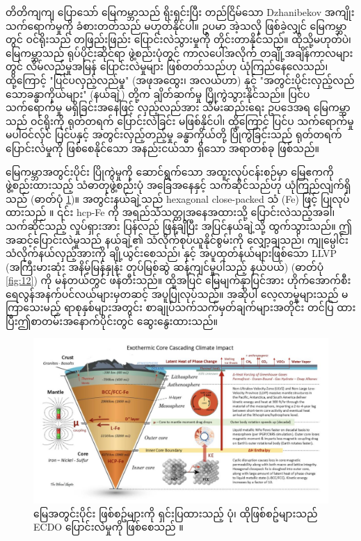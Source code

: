 \documentclass[10pt,twocolumn,letterpaper]{article}
\begin{document}
တိတိကျကျ ပြောသော် မြေကမ္ဘာသည် ရိုးရှင်းပြီး တည်ငြိမ်သော Dzhanibekov အကျိုးသက်ရောက်မှုကို ခံစားတတ်သည် မဟုတ်နိုင်ပါ။ ဥပမာ အဲ့သလို ဖြစ်ခဲ့လျှင် မြေကမ္ဘာတွင် ဝင်ရိုးသည် တဖြည်းဖြည်း ပြောင်းလဲသွားမှုကို တိုင်းတာနိုင်သည်။ ထိုသို့မဟုတ်ပဲ၊ မြေကမ္ဘာသည် ရုပ်ပိုင်းဆိုင်ရာ ဖွဲ့စည်းပုံတွင် ကာလပေါ်အလိုက် တချို့အချိန်ကာလများတွင် လိမ်လည်မှုအမြန် ပြောင်းလဲမှုများ ဖြစ်တတ်သည်ဟု ယုံကြည်နေလေသည်၊ ထို့ကြောင့် "ပြင်ပလှည့်လည်မှု" (အဖုအထွေး၊ အလယ်ဟာ) နှင့် "အတွင်းပိုင်းလှည့်လည်သောခန္ဓာကိုယ်များ" (နယ်ချဲ့) တို့က ချိတ်ဆက်မှု ပြိုကွဲသွားနိုင်သည်။ ပြင်ပ သက်ရောက်မှု မရှိခြင်းအနေဖြင့် လှည့်လည်အား သိမ်းဆည်းရေး ဥပဒေအရ မြေကမ္ဘာသည် ဝင်ရိုးကို ရုတ်တရက် ပြောင်းလဲခြင်း မဖြစ်နိုင်ပါ၊ ထို့ကြောင့် ပြင်ပ သက်ရောက်မှု မပါဝင်လှ်င် ပြင်ပနှင့် အတွင်းလှည့်တည့်မှု ခန္ဓာကိုယ်တို့ ပြိုကွဲခြင်းသည် ရုတ်တရက် ပြောင်းလဲမှုကို ဖြစ်စေနိုင်သော အနည်းငယ်သာ ရှိသော အရာတစ်ခု ဖြစ်သည်။

မြေကမ္ဘာအတွင်းပိုင်း ပြိုကွဲမှုကို ဆောင်ရွက်သော အထူးလုပ်ငန်းစဉ်မှာ မြေဧကကို ဖွဲ့စည်းထားသည့် သံဓာတုဖွဲ့စည်းပုံ အခြေအနေနှင့် သက်ဆိုင်သည်ဟု ယုံကြည်လျက်ရှိသည် (ဓာတ်ပုံ \ref{fig:11})။ အတွင်းနယ်ချဲ့သည် hexagonal close-packed သံ (Fe) ဖြင့် ပြုလုပ်ထားသည် \cite{141}။ ၎င်း hcp-Fe ကို အရည်သံသတ္တုအနေအထားသို့ ပြောင်းလဲသည့်အခါ၊ သက်ဆိုင်သည့် လှုပ်ရှားအား ပြန်လည် ဖြန့်ချိပြီး အပြင်နယ်ချဲ့သို့ ထွက်သွားသည်။ ဤအဆင့်ပြောင်းလဲမှုသည် နယ်ချဲ့၏ သံလိုက်စုပ်ယူနိုင်စွမ်းကို လျှော့ချသည်၊ ကျုမ္ပေါင်းသံလိုက်နယ်လှည့်အားကို ချို့ယွင်းစေသည်၊ နှင့် အပူထုတ်နယ်များဖြစ်သော LLVP (အကြီးမားဆုံး အနိမ့်မြန်နှုန်း တုပ်မြစ်ဆွဲ ဆန့်ကျင်မှုပါသည့် နယ်ပယ်) (ဓာတ်ပုံ \ref{fig:12}) \cite{38} ကို မန်တယ်တွင် ဖန်တီးသည်။ ထို့အပြင် မြေမျက်နှာပြင်အား ဟိုက်အောက်စီးရေလွန်အနက်ပင်လယ်များမှတဆင့် အပူပြုလုပ်သည်။ အဆိုပါ လေ့လာမှုများသည် မကြာသေးမည့် ရာစုနှစ်များအတွင်း စာချုပ်သက်သက်မှတ်ချက်များအတိုင်း တင်ပြ ထားပြီးဤစာတမ်းအနောက်ပိုင်းတွင် ဆွေးနွေးထားသည်။

\begin{figure}[t]
\begin{center}
\includegraphics[width=1\textwidth]{layers.jpg}
\end{center}

   \caption{မြေအတွင်းပိုင်း ဖြစ်စဥ်များကို ရှင်းပြထားသည့် ပုံ၊ ထိုဖြစ်စဥ်များသည် ECDO ပြောင်းလဲမှုကို ဖြစ်စေသည် \cite{129}။}
\label{fig:11}
\end{figure}
\end{document}
